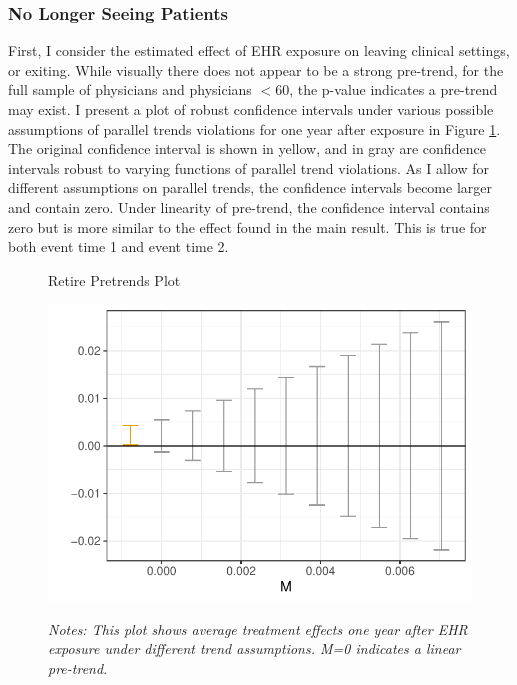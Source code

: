 \documentclass[12pt]{article}
\begin{document}
\subsubsection{No Longer Seeing Patients} 

First, I consider the estimated effect of EHR exposure on leaving clinical settings, or exiting. While visually there does not appear to be a strong pre-trend, for the full sample of physicians and physicians $< 60$, the p-value indicates a pre-trend may exist. I present a plot of robust confidence intervals under various possible assumptions of parallel trends violations for one year after exposure in Figure \ref{fig:pre_retire}. The original confidence interval is shown in yellow, and in gray are confidence intervals robust to varying functions of parallel trend violations. As I allow for different assumptions on parallel trends, the confidence intervals become larger and contain zero. Under linearity of pre-trend, the confidence interval contains zero but is more similar to the effect found in the main result. This is true for both event time 1 and event time 2. 

\begin{figure}[ht]
    \centering
    \captionsetup{width=.5\linewidth}
    \caption{Retire Pretrends Plot}
    \includegraphics[scale=.5]{Objects/retire_pretrends_plot.pdf}
    \label{fig:pre_retire}
    \vspace{2mm}
    \caption*{\footnotesize{\textit{Notes: This plot shows average treatment effects one year after EHR exposure under different trend assumptions. M=0 indicates a linear pre-trend.}}}
\end{figure}
\end{document}
